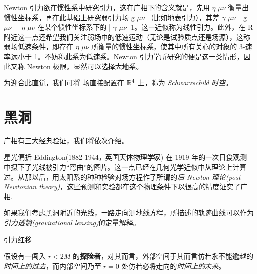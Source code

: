 Newton 引力欲在惯性系中研究引力，这在广相下的含义就是，先用 
 $\eta$  $\mu\nu$ 
 衡量出惯性坐标系，再在此基础上研究弱引力场 
g $\mu\nu$ 
（比如地表引力），其差 
 $\gamma$  $\mu\nu$ =g $\mu\nu$ − $\eta$  $\mu\nu$ 
 在某个惯性坐标系下的 
| $\gamma$  $\mu\nu$ |1。这一近似称为线性引力。此外，在 R
 附近这一点还希望我们关注弱场中的低速运动（无论是试验质点还是场源），这称弱场低速条件，即存在  $\eta$  $\mu\nu$ 
 所衡量的惯性坐标系，使其中所有关心的对象的 3-速率远小于 1。不妨称此系为低速系。Newton 引力学所研究的便是这一类情形，因此又称 Newton 极限。显然可以选择大地系。







为迎合此直觉，我们可将 场直接配置在 $\mathbb{R}^4$ 上，称为 \textit{Schwarzschild 时空}。



\section{黑洞}

广相有三大经典验证，我们将依次介绍。

星光偏折
Eddington(1882-1944，英国天体物理学家) 在 1919 年的一次日食观测中摄下了光线被引力“弯曲”的图片。这一点已经在几何光学近似中从理论上计算过。从那以后，用太阳系的种种检验对场方程作了所谓的\textit{后 Newton 理论(post-Newtonian theory)}，这些预测和实验都在这个物理条件下以很高的精度证实了广相.

如果我们考虑黑洞附近的光线，一路走向测地线方程，所描述的轨迹曲线可以作为\textit{引力透镜(gravitational lensing)}的定量解释。

引力红移


假设有一闯入 $r<2M$ 的\textbf{探险者}，对其而言，外部空间于其而言仿若永不能逾越的\textit{时间上的过去}，而内部空间乃至 $r=0$ 处仿若必将走向的\textit{时间上的未来}。



